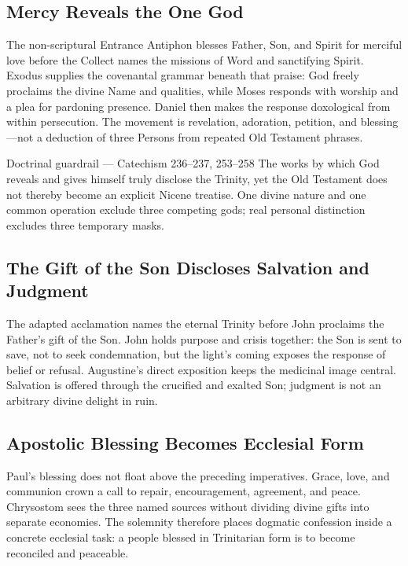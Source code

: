 \begin{deepstudy}
\subsection*{Mercy Reveals the One God\enspace{}}

The non-scriptural Entrance Antiphon blesses Father, Son, and Spirit for merciful love before the Collect names the missions of Word and sanctifying Spirit. Exodus supplies the covenantal grammar beneath that praise: God freely proclaims the divine Name and qualities, while Moses responds with worship and a plea for pardoning presence. Daniel then makes the response doxological from within persecution. The movement is revelation, adoration, petition, and blessing---not a deduction of three Persons from repeated Old Testament phrases.

\begin{sourcecard}{Doctrinal guardrail --- Catechism 236--237, 253--258}
The works by which God reveals and gives himself truly disclose the Trinity, yet the Old Testament does not thereby become an explicit Nicene treatise. One divine nature and one common operation exclude three competing gods; real personal distinction excludes three temporary masks.
\end{sourcecard}

\subsection*{The Gift of the Son Discloses Salvation and Judgment\enspace{}}

The adapted acclamation names the eternal Trinity before John proclaims the Father's gift of the Son. John holds purpose and crisis together: the Son is sent to save, not to seek condemnation, but the light's coming exposes the response of belief or refusal. Augustine's direct exposition keeps the medicinal image central. Salvation is offered through the crucified and exalted Son; judgment is not an arbitrary divine delight in ruin.

\subsection*{Apostolic Blessing Becomes Ecclesial Form\enspace{}}

Paul's blessing does not float above the preceding imperatives. Grace, love, and communion crown a call to repair, encouragement, agreement, and peace. Chrysostom sees the three named sources without dividing divine gifts into separate economies. The solemnity therefore places dogmatic confession inside a concrete ecclesial task: a people blessed in Trinitarian form is to become reconciled and peaceable.


\end{deepstudy}
